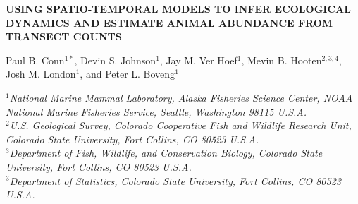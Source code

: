 \documentclass[12pt,fleqn]{article}
\begin{document}
\begin{center} \bf {\large USING SPATIO-TEMPORAL MODELS TO INFER ECOLOGICAL DYNAMICS AND ESTIMATE ANIMAL ABUNDANCE FROM TRANSECT COUNTS}

\vspace{0.7cm}
Paul B. Conn$^{1*}$, Devin S. Johnson$^1$, Jay M. Ver Hoef$^1$, Mevin B. Hooten$^{2,3,4}$, Josh M. London$^1$, and Peter L. Boveng$^1$
\end{center}
\vspace{0.5cm}

\rm
\small

\it $^1$National Marine Mammal Laboratory, Alaska Fisheries Science Center,
NOAA National Marine Fisheries Service,
Seattle, Washington 98115 U.S.A.\\

\it $^2$U.S. Geological Survey, Colorado Cooperative Fish and Wildlife Research Unit, Colorado State University, Fort Collins, CO 80523 U.S.A.\\

\it $^3$Department of Fish, Wildlife, and Conservation Biology, Colorado State University, Fort Collins, CO 80523 U.S.A.\\

\it $^3$Department of Statistics, Colorado State University, Fort Collins, CO 80523 U.S.A.\\
\end{document}
